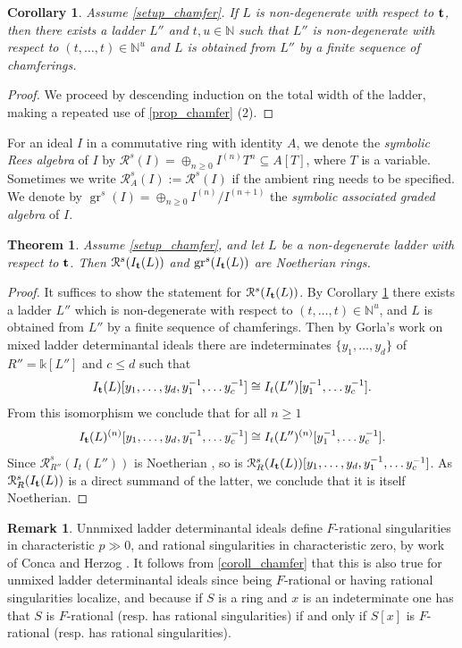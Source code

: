 \documentclass[12pt]{amsart}
\renewcommand{\leq}{\leqslant}
\renewcommand{\geq}{\geqslant}
\newtheorem{theorem}{Theorem}[section]
\newtheorem{corollary}[corollary]{Corollary}
\theoremstyle{definition}
\newtheorem{remark}[remark]{Remark}
\newcommand{\R}[1]{R^{1/p^{#1}}}
\renewcommand{\(}{\left(}
\renewcommand{\)}{\right)}
\newcommand{\NN}{\mathbb{N} }
\newcommand{\kk}{\mathbb{k}}
\newcommand{\gr}{\operatorname{gr}}
\def \R{\mathcal R}
\renewcommand{\!}[1]{{\color{red}\text{\Huge$\star$ }#1}}
\newcommand{\gs}{\geqslant}
\newcommand{\ttt}{{\bf t}}
\begin{document}
\begin{corollary} \label{coroll_chamfer}
Assume \autoref{setup_chamfer}. If $L$ is  non-degenerate with respect to $\ttt$, then there exists a ladder $L''$ and $t,u\in \NN$ such that $L''$ is non-degenerate with respect to $(t,\ldots, t)\in \NN^u$ and $L$ is obtained from $L''$ by a finite sequence of chamferings. 
\end{corollary}
\begin{proof}
We proceed by descending induction on the total width of the ladder, making a repeated use of \autoref{prop_chamfer} (2).
\end{proof}

For an ideal $I$ in a commutative ring with identity $A$, we denote the {\it symbolic Rees algebra} of $I$ by $\R^s(I)=\oplus_{n\gs 0}I^{(n)}T^n\subseteq A[T]$, where $T$ is a variable. Sometimes we write  $\R^s_A(I):=\R^s(I)$ if the ambient ring needs to be specified. We denote by $\gr^s(I)=\oplus_{n\gs 0}I^{(n)}/I^{(n+1)}$ the {\it symbolic associated graded algebra} of $I$. 

\begin{theorem} \label{ThmNoetherian}
Assume \autoref{setup_chamfer}, and let $L$ be a non-degenerate ladder with respect to $\ttt$. Then $\R^s(I_\ttt(L))$ and $\gr^s(I_\ttt(L))$ are Noetherian rings.
\end{theorem}
\begin{proof}
It suffices to show the statement for $\R^s(I_\ttt(L))$. By Corollary \ref{coroll_chamfer} there exists a ladder $L''$ which is non-degenerate with respect to $(t,\ldots,t) \in \NN^u$, and $L$ is obtained from $L''$ by a finite sequence of chamferings. Then by Gorla's work on mixed ladder determinantal ideals \cite[Lemma 1.19]{GorlaMixed} there are indeterminates $\{y_1,\ldots,y_d\}$ of $R''=\kk[L'']$ and $c \leq d$ such that 
\[
I_\ttt(L)[y_1,\ldots,y_d,y_1^{-1},\ldots y_c^{-1}] \cong I_t(L'')[y_1^{-1},\ldots y_c^{-1}].
\]
From this isomorphism we conclude that for all $n \geq 1$
\[
I_\ttt(L)^{(n)}[y_1,\ldots,y_d,y_1^{-1},\ldots y_c^{-1}] \cong I_t(L'')^{(n)}[y_1^{-1},\ldots y_c^{-1}].
\]
Since $\R^s_{R''}(I_t(L''))$ is Noetherian \cite{brunsconca98}, so is $\R^s_R(I_\ttt(L))[y_1,\ldots,y_d,y_1^{-1},\ldots y_c^{-1}]$. As $\R^s_R(I_\ttt(L))$ is a direct summand of the latter, we conclude that it is itself Noetherian.
\end{proof}

\begin{remark} Unnmixed ladder determinantal ideals define $F$-rational singularities in characteristic $p\gg0$, and rational singularities in characteristic zero, by work of Conca and Herzog \cite{concaherzog1997}. It follows from \autoref{coroll_chamfer} that this is also true for unmixed ladder determinantal ideals since being $F$-rational or having rational singularities localize, and because if $S$ is a ring and $x$ is an indeterminate one has that $S$ is $F$-rational (resp. has rational singularities) if and only if $S[x]$ is $F$-rational (resp. has rational singularities).
\end{remark}
\end{document}
